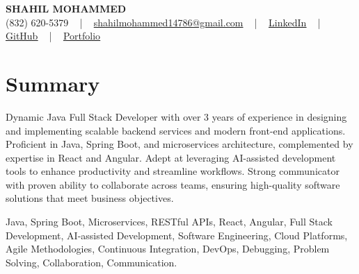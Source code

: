 \documentclass[letterpaper,10pt]{article}
\begin{document}
\begin{center}
    {\fontsize{14pt}{12pt}\selectfont \textbf{\MakeUppercase{Shahil Mohammed}}}\\ \vspace{2pt}
    \fontsize{10pt}{12pt}\selectfont (832) 620-5379 ~ | ~ \href{mailto:shahilmohammed14786@gmail.com}{shahilmohammed14786@gmail.com} ~ | ~  
    \href{https://www.linkedin.com/in/shahil-mohammed-9652931a1/}{\color{blue}\underline{LinkedIn}}  ~ | ~ 
    \href{https://github.com/freakbeast14}{\color{blue}\underline{GitHub}} ~ | ~ 
    \href{https://shahil-mohammed.netlify.app/}{\color{blue}\underline{Portfolio}}
    \vspace{-8pt}
\end{center}

\section{Summary}
\vspace{-2pt}\fontsize{8pt}{9pt}\selectfont
Dynamic Java Full Stack Developer with over 3 years of experience in designing and implementing scalable backend services and modern front-end applications. Proficient in Java, Spring Boot, and microservices architecture, complemented by expertise in React and Angular. Adept at leveraging AI-assisted development tools to enhance productivity and streamline workflows. Strong communicator with proven ability to collaborate across teams, ensuring high-quality software solutions that meet business objectives.
 \vspace{-5pt}
 
{\fontsize{1pt}{1pt}\selectfont\color{white}
Java, Spring Boot, Microservices, RESTful APIs, React, Angular, Full Stack Development, AI-assisted Development, Software Engineering, Cloud Platforms, Agile Methodologies, Continuous Integration, DevOps, Debugging, Problem Solving, Collaboration, Communication.
}
\vspace{-8pt}

\vspace{-2pt}
\end{document}
